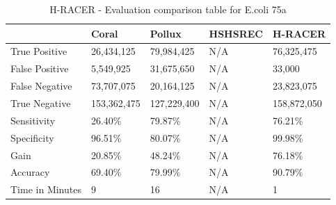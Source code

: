 \documentclass[12pt,openany]{llncs}
\newcommand{\TBstrut}{{\rule{0pt}{7ex}}{\rule[2ex]{0pt}{0pt}}} %
\begin{document}
\begin{longtable}{|m{33mm}|m{20mm}|m{20mm}|m{20mm}|m{20mm}|}
	    \caption{\label{tab:eval-3}H-RACER - Evaluation comparison table for E.coli 75a}\\
        \hline
           & Coral & Pollux & HSHSREC & H-RACER\cellcolor{DarkGray} \TBstrut\\ %
        \hline
           True Positive & 26,434,125 & 79,984,425 & N/A & 76,325,475\cellcolor{LightGray} \TBstrut\\ %
        \hline
           False Positive & 5,549,925 & 31,675,650 & N/A & 33,000\cellcolor{LightGray} \TBstrut\\ %
        \hline
           False Negative & 73,707,075 & 20,164,125 & N/A & 23,823,075\cellcolor{LightGray} \TBstrut\\ %
        \hline
           True Negative & 153,362,475 & 127,229,400 & N/A & 158,872,050\cellcolor{LightGray} \TBstrut\\ %
        \hline
           Sensitivity & 26.40\% & 79.87\% & N/A & 76.21\%\cellcolor{LightGray} \TBstrut\\ %
        \hline
           Specificity & 96.51\% & 80.07\% & N/A & 99.98\%\cellcolor{LightGray} \TBstrut\\ %
        \hline
           Gain & 20.85\% & 48.24\% & N/A & 76.18\%\cellcolor{LightGray} \TBstrut\\ %
        \hline
           Accuracy & 69.40\% & 79.99\% & N/A & 90.79\%\cellcolor{LightGray} \TBstrut\\ %
        \hline
           Time in Minutes& 9 & 16 & N/A & 1\cellcolor{LightGray} \TBstrut\\ %
        \hline
\end{longtable}
\newpage
\end{document}
